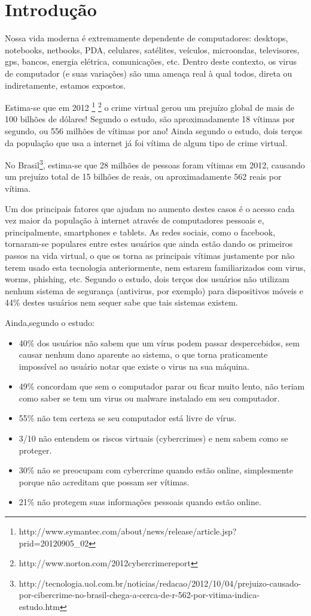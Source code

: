 \chapter{Introdução}

Nossa vida moderna é extremamente dependente de computadores: desktops, notebooks, netbooks, PDA, celulares, satélites, veículos, microondas, televisores, gps, bancos, energia elétrica, comunicações, etc. Dentro deste contexto, os virus de computador (e suas variações) são uma ameaça real à qual todos, direta ou indiretamente, estamos expostos.

Estima-se que em 2012 \footnote{http://www.symantec.com/about/news/release/article.jsp?prid=20120905\_02} \footnote{http://www.norton.com/2012cybercrimereport} o crime virtual gerou um prejuízo global de mais de 100 bilhões de dólares! Segundo o estudo, são aproximadamente 18 vítimas por segundo, ou 556 milhões de vítimas por ano! Ainda segundo o estudo, dois terços da população que usa a internet já foi vítima de algum tipo de crime virtual.

No Brasil\footnote{http://tecnologia.uol.com.br/noticias/redacao/2012/10/04/prejuizo-causado-por-cibercrime-no-brasil-chega-a-cerca-de-r-562-por-vitima-indica-estudo.htm}, estima-se que 28 milhões de pessoas foram vítimas em 2012, causando um prejuízo total de 15 bilhões de reais, ou aproximadamente 562 reais por vítima.

Um dos principais fatores que ajudam no aumento destes casos é o acesso cada vez maior da população à internet através de computadores pessoais e, principalmente, smartphones e tablets. As redes sociais, como o facebook, tornaram-se populares entre estes usuários que ainda estão dando os primeiros passos na vida virtual, o que os torna as principais vítimas justamente por não terem usado esta tecnologia anteriormente, nem estarem familiarizados com virus, worms, phishing, etc. Segundo o estudo, dois terços dos usuários não utilizam nenhum sistema de segurança (antivirus, por exemplo) para dispositivos móveis e 44\% destes usuários nem sequer sabe que tais sistemas existem.

Ainda,segundo o estudo:
\begin{itemize}
\item 40\% dos usuários não sabem que um vírus podem passar despercebidos, sem causar nenhum dano aparente ao sistema, o que torna praticamente impossível ao usuário notar que existe o virus na sua máquina. 
\item 49\% concordam que sem o computador parar ou ficar muito lento, não teriam como saber se tem um virus ou malware instalado em seu computador. 
\item 55\% não tem certeza se seu computador está livre de vírus.
\item 3/10 não entendem os riscos virtuais (cybercrimes) e nem sabem como se proteger.
\item 30\% não se preocupam com cybercrime quando estão online, simplesmente porque não acreditam que possam ser vítimas.
\item 21\% não protegem suas informações pessoais quando estão online.
\end{itemize}

